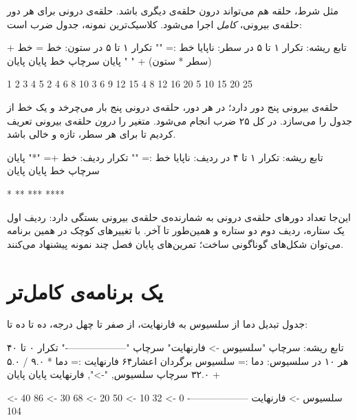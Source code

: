 مثل شرط، حلقه هم می‌تواند درون حلقه‌ی دیگری باشد. حلقه‌ی درونی برای هر دور
حلقه‌ی بیرونی، \emph{کامل} اجرا می‌شود. کلاسیک‌ترین نمونه، جدول ضرب است:

\begin{salamfa}
تابع ریشه:
    تکرار ۱ تا ۵ در سطر:
        ناپایا خط := ""
        تکرار ۱ تا ۵ در ستون:
            خط = خط + (سطر * ستون) + " "
        پایان
        سرچاپ خط
    پایان
پایان
\end{salamfa}

\begin{outputfa}
1 2 3 4 5
2 4 6 8 10
3 6 9 12 15
4 8 12 16 20
5 10 15 20 25
\end{outputfa}

حلقه‌ی بیرونی پنج دور دارد؛ در هر دور، حلقه‌ی درونی پنج بار می‌چرخد و یک
خط از جدول را می‌سازد. در کل ۲۵ ضرب انجام می‌شود. متغیر  را
\emph{درون} حلقه‌ی بیرونی تعریف کردیم تا برای هر سطر، تازه و خالی باشد.

\begin{salamfa}
تابع ریشه:
    تکرار ۱ تا ۴ در ردیف:
        ناپایا خط := ""
        تکرار ردیف:
            خط += "*"
        پایان
        سرچاپ خط
    پایان
پایان
\end{salamfa}

\begin{outputfa}
*
**
***
****
\end{outputfa}

این‌جا تعداد دورهای حلقه‌ی درونی به شمارنده‌ی حلقه‌ی بیرونی بستگی دارد:
ردیف اول یک ستاره، ردیف دوم دو ستاره و همین‌طور تا آخر. با تغییرهای کوچک
در همین برنامه می‌توان شکل‌های گوناگونی ساخت؛ تمرین‌های پایان فصل چند
نمونه پیشنهاد می‌کنند.

\section{یک برنامه‌ی کامل‌تر}

جدول تبدیل دما از سلسیوس به فارنهایت، از صفر تا چهل درجه، ده تا ده تا:

\begin{salamfa}
تابع ریشه:
    سرچاپ "سلسیوس -> فارنهایت"
    سرچاپ "-------------------"
    تکرار ۰ تا ۴۰ هر ۱۰ در سلسیوس:
        دما := سلسیوس برگردان اعشار۶۴
        فارنهایت := دما * ۹.۰ / ۵.۰ + ۳۲.۰
        سرچاپ سلسیوس, "->", فارنهایت
    پایان
پایان
\end{salamfa}

\begin{outputfa}
سلسیوس -> فارنهایت
-------------------
0 -> 32
10 -> 50
20 -> 68
30 -> 86
40 -> 104
\end{outputfa}


